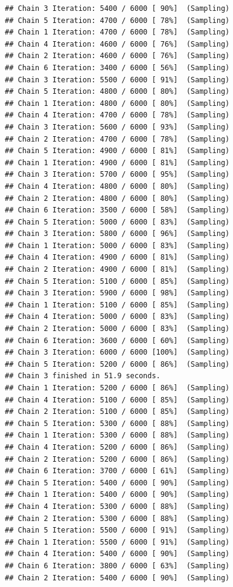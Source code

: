 \documentclass[
]{article}
\begin{document}
\begin{verbatim}
## Chain 3 Iteration: 5400 / 6000 [ 90%]  (Sampling) 
## Chain 5 Iteration: 4700 / 6000 [ 78%]  (Sampling) 
## Chain 1 Iteration: 4700 / 6000 [ 78%]  (Sampling) 
## Chain 4 Iteration: 4600 / 6000 [ 76%]  (Sampling) 
## Chain 2 Iteration: 4600 / 6000 [ 76%]  (Sampling) 
## Chain 6 Iteration: 3400 / 6000 [ 56%]  (Sampling) 
## Chain 3 Iteration: 5500 / 6000 [ 91%]  (Sampling) 
## Chain 5 Iteration: 4800 / 6000 [ 80%]  (Sampling) 
## Chain 1 Iteration: 4800 / 6000 [ 80%]  (Sampling) 
## Chain 4 Iteration: 4700 / 6000 [ 78%]  (Sampling) 
## Chain 3 Iteration: 5600 / 6000 [ 93%]  (Sampling) 
## Chain 2 Iteration: 4700 / 6000 [ 78%]  (Sampling) 
## Chain 5 Iteration: 4900 / 6000 [ 81%]  (Sampling) 
## Chain 1 Iteration: 4900 / 6000 [ 81%]  (Sampling) 
## Chain 3 Iteration: 5700 / 6000 [ 95%]  (Sampling) 
## Chain 4 Iteration: 4800 / 6000 [ 80%]  (Sampling) 
## Chain 2 Iteration: 4800 / 6000 [ 80%]  (Sampling) 
## Chain 6 Iteration: 3500 / 6000 [ 58%]  (Sampling) 
## Chain 5 Iteration: 5000 / 6000 [ 83%]  (Sampling) 
## Chain 3 Iteration: 5800 / 6000 [ 96%]  (Sampling) 
## Chain 1 Iteration: 5000 / 6000 [ 83%]  (Sampling) 
## Chain 4 Iteration: 4900 / 6000 [ 81%]  (Sampling) 
## Chain 2 Iteration: 4900 / 6000 [ 81%]  (Sampling) 
## Chain 5 Iteration: 5100 / 6000 [ 85%]  (Sampling) 
## Chain 3 Iteration: 5900 / 6000 [ 98%]  (Sampling) 
## Chain 1 Iteration: 5100 / 6000 [ 85%]  (Sampling) 
## Chain 4 Iteration: 5000 / 6000 [ 83%]  (Sampling) 
## Chain 2 Iteration: 5000 / 6000 [ 83%]  (Sampling) 
## Chain 6 Iteration: 3600 / 6000 [ 60%]  (Sampling) 
## Chain 3 Iteration: 6000 / 6000 [100%]  (Sampling) 
## Chain 5 Iteration: 5200 / 6000 [ 86%]  (Sampling) 
## Chain 3 finished in 51.9 seconds.
## Chain 1 Iteration: 5200 / 6000 [ 86%]  (Sampling) 
## Chain 4 Iteration: 5100 / 6000 [ 85%]  (Sampling) 
## Chain 2 Iteration: 5100 / 6000 [ 85%]  (Sampling) 
## Chain 5 Iteration: 5300 / 6000 [ 88%]  (Sampling) 
## Chain 1 Iteration: 5300 / 6000 [ 88%]  (Sampling) 
## Chain 4 Iteration: 5200 / 6000 [ 86%]  (Sampling) 
## Chain 2 Iteration: 5200 / 6000 [ 86%]  (Sampling) 
## Chain 6 Iteration: 3700 / 6000 [ 61%]  (Sampling) 
## Chain 5 Iteration: 5400 / 6000 [ 90%]  (Sampling) 
## Chain 1 Iteration: 5400 / 6000 [ 90%]  (Sampling) 
## Chain 4 Iteration: 5300 / 6000 [ 88%]  (Sampling) 
## Chain 2 Iteration: 5300 / 6000 [ 88%]  (Sampling) 
## Chain 5 Iteration: 5500 / 6000 [ 91%]  (Sampling) 
## Chain 1 Iteration: 5500 / 6000 [ 91%]  (Sampling) 
## Chain 4 Iteration: 5400 / 6000 [ 90%]  (Sampling) 
## Chain 6 Iteration: 3800 / 6000 [ 63%]  (Sampling) 
## Chain 2 Iteration: 5400 / 6000 [ 90%]  (Sampling) 

\end{verbatim}
\end{document}
